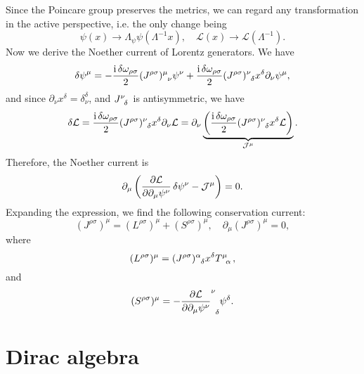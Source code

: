 \documentclass[hyperref, a4paper]{article}
\newcommand*{\ii}{\mathrm{i}}
\begin{document}
Since the Poincare group preserves the metrics, we can regard any transformation in the active perspective, i.e.
the only change being 
\begin{equation}
    \psi(x) \longrightarrow \Lambda_{\psi} \psi(\Lambda^{-1} x), \quad \mathcal{L}(x) \longrightarrow \mathcal{L}(\Lambda^{-1}).
\end{equation}
Now we derive the Noether current of Lorentz generators. We have 
\[
    \var{\psi}^\mu = - \frac{\ii \var{\omega_{\rho \sigma}}}{2} (J^{\rho \sigma})\indices{^\mu_\nu} \psi^\nu
    + \frac{\ii \var{\omega_{\rho \sigma}}}{2} (J^{\rho \sigma})\indices{^\nu_\delta} x^\delta \partial_\nu \psi^\mu,
\]
and since $\partial_\nu x^\delta = \delta^\delta_\nu$, and $J\indices{^\nu_\delta}$ is antisymmetric, we have
\[
    \var{\mathcal{L}} = \frac{\ii \var{\omega_{\rho \sigma}}}{2} (J^{\rho \sigma})\indices{^\nu_\delta} x^\delta \partial_\nu \mathcal{L} = \partial_\nu \underbrace{\left( \frac{\ii \var{\omega_{\rho \sigma}}}{2} (J^{\rho \sigma})\indices{^\nu_\delta} x^\delta  \mathcal{L} \right)}_{\mathcal{J}^\mu}.
\]
Therefore, the Noether current is 
\[
    \partial_\mu\left( \pdv{\mathcal{L}}{\partial_\mu \psi^\nu} \var{\psi^\nu} - \mathcal{J}^\mu \right) = 0.
\]
Expanding the expression, we find the following conservation current:
\begin{equation}
    (J^{\rho \sigma})^\mu = (L^{\rho \sigma})^\mu + (S^{\rho \sigma})^\mu, \quad \partial_\mu (J^{\rho \sigma})^\mu = 0,
\end{equation}
where 
\begin{equation}
    (L^{\rho \sigma})^\mu = (J^{\rho \sigma})\indices{^\alpha_\delta} x^\delta T\indices{^\mu_\alpha},
\end{equation}
and 
\begin{equation}
    (S^{\rho \sigma})^\mu = - \pdv{\mathcal{L}}{\partial_\mu \psi^\nu} (J^{\rho \sigma})\indices{^\nu_\delta} \psi^\delta.
    \label{eq:spin-angular}
\end{equation}

\section{Dirac algebra}
\end{document}
